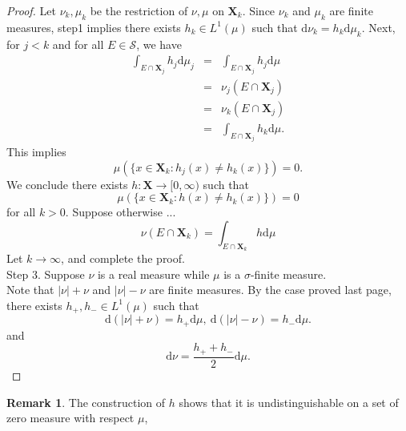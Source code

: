 \documentclass[12pt]{book}
\theoremstyle{definition}
\newtheorem{remark}{Remark}
\newcommand{\X}{\mathbf{X}}
\newcommand{\D}{\mathrm{d}}
\begin{document}
\begin{proof}
Let $\nu_k,\mu_k$ be the restriction of $\nu,\mu$ on $\X_k$. Since $\nu_k$ and $\mu_k$ are finite measures, step1 implies there exists $h_k \in L^1(\mu)$ such that $\D \nu_k = h_k \D\mu_k$. Next, for $j<k$ and for all $E \in \mathcal S$, we have
\begin{eqnarray*}
	\int_{E\cap\X_j}h_j \D \mu_j &=& \int_{E\cap \X_j}h_j \D \mu \\
	&=& \nu_j(E\cap \X_j) \\
	&=& \nu_k(E \cap \X_j) \\
	&=& \int_{E \cap \X_j}h_k \D \mu.
\end{eqnarray*}
This implies 
$$
\mu(\{x\in \X_k: h_j(x)\neq h_k(x)\})=0.
$$
We conclude there exists $h:\X \to [0,\infty)$ such that 
$$
\mu(\{x\in \X_k: h(x)\neq h_k(x)\})=0
$$
for all $k>0$. Suppose otherwise ...
$$
\nu(E\cap \X_k) = \int_{E\cap \X_k} h\D \mu
$$
Let $k \to \infty$, and complete the proof. \\
Step 3. Suppose $\nu$ is a real measure while $\mu$ is a $\sigma$-finite measure. \\
Note that $|\nu|+\nu$ and $|\nu|-\nu$ are finite measures. By the case proved last page, there exists $h_+, h_- \in L^1(\mu)$ such that 
$$
\D (|\nu|+\nu) = h_+ \D \mu,\ \D (|\nu|-\nu) = h_- \D \mu.
$$
and 
$$
\D \nu = \frac{h_+ + h_-}{2}\D \mu.
$$
\end{proof}





































\begin{remark}
The construction of $h$ shows that it is undistinguishable on a set of zero measure with respect $\mu$,
\end{remark}
\end{document}
